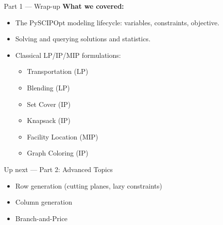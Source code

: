 \documentclass[aspectratio=169,10pt]{beamer}
\begin{document}
\begin{frame}{Part 1 --- Wrap-up}
\textbf{What we covered:}
\begin{itemize}
  \item The PySCIPOpt modeling lifecycle: variables, constraints, objective.
  \item Solving and querying solutions and statistics.
  \item Classical LP/IP/MIP formulations:
    \begin{itemize}
      \item Transportation (LP)
      \item Blending (LP)
      \item Set Cover (IP)
      \item Knapsack (IP)
      \item Facility Location (MIP)
      \item Graph Coloring (IP)
    \end{itemize}
\end{itemize}

\medskip
\begin{block}{Up next --- Part 2: Advanced Topics}
\begin{itemize}
  \item Row generation (cutting planes, lazy constraints)
  \item Column generation
  \item Branch-and-Price
\end{itemize}
\end{block}
\end{frame}
\end{document}
